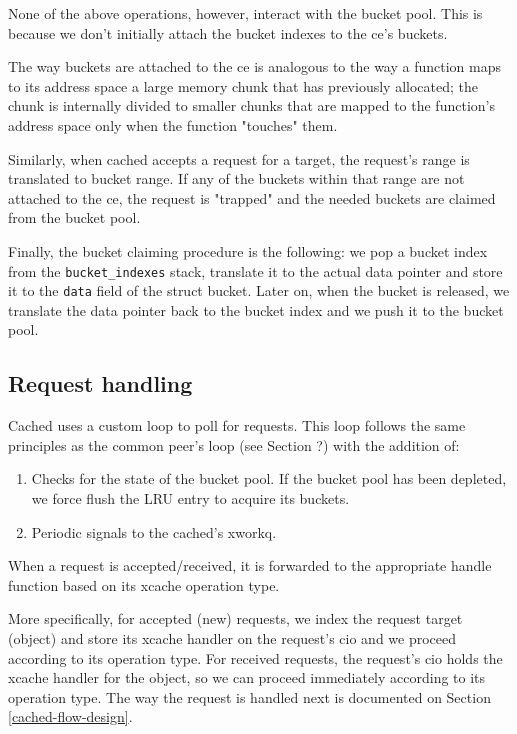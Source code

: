 None of the above operations, however, interact with the bucket pool. This is 
because we don't initially attach the bucket indexes to the ce's buckets.

The way buckets are attached to the ce is analogous to the way a function maps 
to its address space a large memory chunk that has previously allocated; the 
chunk is internally divided to smaller chunks that are mapped to the function's 
address space only when the function "touches" them.

Similarly, when cached accepts a request for a target, the request's range is 
translated to bucket range. If any of the buckets within that range are not 
attached to the ce, the request is "trapped" and the needed buckets are claimed 
from the bucket pool.

Finally, the bucket claiming procedure is the following: we pop a bucket index 
from the \texttt{bucket\_indexes} stack, translate it to the actual data 
pointer and store it to the \texttt{data} field of the struct bucket. Later on, 
when the bucket is released, we translate the data pointer back to the bucket 
index and we push it to the bucket pool.

\subsection{Request handling}

Cached uses a custom loop to poll for requests. This loop follows the same 
principles as the common peer's loop (see Section ?) with the addition of:

\begin{enumerate}
	\item Checks for the state of the bucket pool. If the bucket pool has 
		been depleted, we force flush the LRU entry to acquire its 
		buckets.
	\item Periodic signals to the cached's xworkq.
\end{enumerate}

When a request is accepted/received, it is forwarded to the appropriate handle 
function based on its xcache operation type.

More specifically, for accepted (new) requests, we index the request target 
(object) and store its xcache handler on the request's cio and we proceed 
according to its operation type. For received requests, the request's cio holds 
the xcache handler for the object, so we can proceed immediately according to 
its operation type. The way the request is handled next is documented on 
Section \ref{cached-flow-design}.

